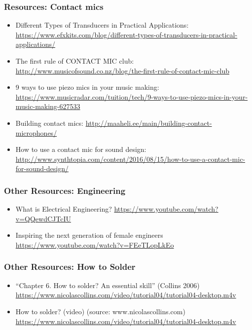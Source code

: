 \documentclass[screen, aspectratio=43]{beamer}
\begin{document}
\begin{frame}
  \frametitle{Resources: Contact mics}
    \begin{itemize}
    	\item Different Types of Transducers in Practical Applications: \url{https://www.efxkits.com/blog/different-types-of-transducers-in-practical-applications/}
	\item The first rule of CONTACT MIC club: \url{http://www.musicofsound.co.nz/blog/the-first-rule-of-contact-mic-club}
	\item 9 ways to use piezo mics in your music making: \url{https://www.musicradar.com/tuition/tech/9-ways-to-use-piezo-mics-in-your-music-making-627533}
	\item Building contact mics: \url{http://maaheli.ee/main/building-contact-microphones/}
	\item How to use a contact mic for sound design: \url{http://www.synthtopia.com/content/2016/08/15/how-to-use-a-contact-mic-for-sound-design/}
    \end{itemize}    
\end{frame}
%
\begin{frame}
  \frametitle{Other Resources: Engineering}
    \begin{itemize}
    \item What is Electrical Engineering? \url{https://www.youtube.com/watch?v=QQewdCJTcIU}
    \item Inspiring the next generation of female engineers \url{https://www.youtube.com/watch?v=FEeTLopLkEo}
    \end{itemize}
\end{frame}
%
\begin{frame}
  \frametitle{Other Resources: How to Solder}
    \begin{itemize}
    \item ``Chapter 6. How to solder? An essential skill'' (Collins 2006)\\
    \url{https://www.nicolascollins.com/video/tutorial04/tutorial04-desktop.m4v}     
    \item How to solder? (video) (source: www.nicolascollins.com)\\
    \url{https://www.nicolascollins.com/video/tutorial04/tutorial04-desktop.m4v} 
    \end{itemize}
\end{frame}
%
\end{document}
